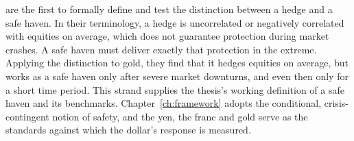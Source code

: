 \textcite{baur_lucey_2010} are the first to formally define and test the distinction between a hedge and a safe haven. In their terminology, a hedge is uncorrelated or negatively correlated with equities on average, which does not guarantee protection during market crashes. A safe haven must deliver exactly that protection in the extreme. Applying the distinction to gold, they find that it hedges equities on average, but works as a safe haven only after severe market downturns, and even then only for a short time period. This strand supplies the thesis's working definition of a safe haven and its benchmarks. Chapter~\ref{ch:framework} adopts the conditional, crisis-contingent notion of safety, and the yen, the franc and gold serve as the standards against which the dollar's response is measured.



